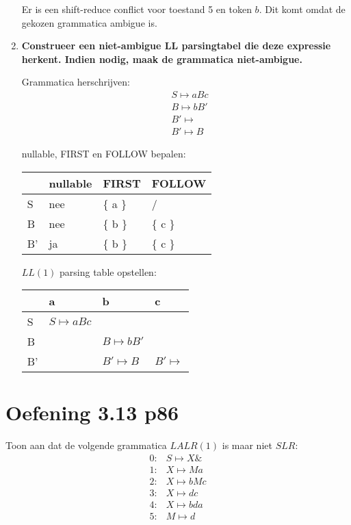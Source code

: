 \begin{enumerate}
	Er is een shift-reduce conflict voor toestand 5 en token $b$. Dit komt omdat de gekozen grammatica ambigue is.

	\item \textbf{Construeer een niet-ambigue LL parsingtabel die deze expressie herkent. Indien nodig, maak de grammatica niet-ambigue.}
		
		Grammatica herschrijven:
	\begin{equation*}
	\begin{split}
	& S \mapsto aBc \\
	& B \mapsto bB' \\
	& B' \mapsto  \\
	& B' \mapsto B 
	\end{split}
	\end{equation*}
	
	nullable, FIRST en FOLLOW bepalen:
	\begin{table}[ht]
		\centering
		\begin{tabular}{| l | l | l | l |}
			\hline
			& nullable & FIRST & FOLLOW \\
			\hline
			S & nee  & \{ a \}    & /	 			\\
			B & nee  & \{ b \}    & \{ c \}	\\
			B' & ja  & \{ b \}    & \{ c \}			\\
			\hline
		\end{tabular}
	\end{table}

	$LL(1)$ parsing table opstellen:
	
	\begin{table}[h]
		\centering
		\begin{tabular}{| l | l | l | l |}
			\hline
			  & a 					& b & c \\
			  \hline
			S & $S \mapsto aBc$	    &   &   \\
			B &   					& $B \mapsto bB'$  &   \\
			B' &  & $B' \mapsto B$ & $B' \mapsto$ \\
			\hline
		\end{tabular}
	\end{table}
	
\end{enumerate}

\section{Oefening 3.13 p86}
Toon aan dat de volgende grammatica $LALR(1)$ is maar niet $SLR$:
\begin{equation*}
\begin{split}
0 :& S \mapsto X\& \\
1 :& X \mapsto Ma \\
2 :& X \mapsto bMc \\
3 :& X \mapsto dc \\
4 :& X \mapsto bda \\
5 :& M \mapsto d
\end{split}
\end{equation*}

